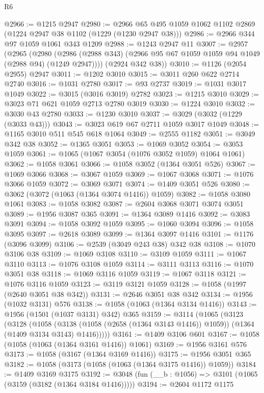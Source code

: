 \begin{lexlean}{R6}
\begin{coremodule}
@2966 := @1215 @2947
@2980 := @2966 @65 @495 @1059 @1062 @1102 @2869 (@1224 @2947 @38 @1102 (@1229 (@1230 @2947 @38)))
@2986 := @2966 @344 @97 @1059 @1061 @343 @1209
@2988 := @1243 @2947 @11
@3007 := @2957
    (@2965
      (@2980 (@2986 (@2988 @343) (@2966 @95 @67 @1059 @1059 @94 @1049 (@2988 @94) (@1249 @2947))))
      (@2924 @342 @38))
@3010 := @1126 (@2054 @2955) @2947
@3011 := @1202 @3010
@3015 := @3011 @260 @622 @2714 @2740
@3016 := @1031 @2780
@3017 := @93 @2737
@3019 := @1031 @3017 @1049
@3022 := @3015 (@3016 @3019) @2782
@3023 := @1215 @3010
@3029 := @3023 @71 @621 @1059 @2713 @2780 @3019
@3030 := @1224 @3010
@3032 := @3030 @43 @2780
@3033 := @1230 @3010
@3037 := @3029 (@3032 (@1229 (@3033 @43)))
@3043 := @3023 @619 @67 @2711 @1059 @3017 @1049
@3048 := @1165 @3010 @511 @545 @618 @1064
@3049 := @2555 @1182
@3051 := @3049 @342 @38
@3052 := @1365 @3051
@3053 := @1069 @3052
@3054 := @3053 @1059
@3061 := @1065 (@1067 @3054 (@1076 @3052 @1059) @1064 @1061)
@3062 := @1058 @3061
@3066 := @1058 @3052 (@1364 @3051 @526)
@3067 := @1069 @3066
@3068 := @3067 @1059
@3069 := @1067 @3068
@3071 := @1076 @3066 @1059
@3072 := @3069 @3071
@3074 := @1409 @3051 @526
@3080 := @3062 (@3072 (@1063 (@1364 @3074 @1416)) @1059)
@3082 := @1058 @3080 @1061
@3083 := @1058 @3082
@3087 := @2604 @3068 @3071 @3074 @3051
@3089 := @1956 @3087 @365
@3091 := @1364 @3089 @1416
@3092 := @3083 @3091
@3094 := @1058 @3092 @1059
@3095 := @1060 @3094
@3096 := @1058 @3095
@3097 := @2618 @3089
@3099 := @1364 @3097 @1416
@3101 := @1176 (@3096 @3099)
@3106 := @2539 (@3049 @243 @38) @342 @38
@3108 := @1070 @3106 @38
@3109 := @1069 @3108
@3110 := @3109 @1059
@3111 := @1067 @3110
@3113 := @1076 @3108 @1059
@3114 := @3111 @3113
@3116 := @1070 @3051 @38
@3118 := @1069 @3116 @1059
@3119 := @1067 @3118
@3121 := @1076 @3116 @1059
@3123 := @3119 @3121 @1059
@3128 := @1058 (@1997 (@2640 @3051 @38 @342))
@3131 := @2646 @3051 @38 @342
@3134 := @1956 (@1032 @3131) @576
@3138 := @1058 (@1063 (@1364 @3134 @1416))
@3143 := @1956 (@1501 (@1037 @3131) @342) @365
@3159 := @3114
    (@1065
      (@3123
        (@3128
          (@1058
            (@3138 (@1058 (@2658 (@1364 @3143 @1416)) @1059))
            (@1364 (@1409 @3134 @3143) @1416)))))
@3161 := @1409 @3106 @601
@3167 := @1058 (@1058 (@1063 (@1364 @3161 @1416)) @1061)
@3169 := @1956 @3161 @576
@3173 := @1058 (@3167 (@1364 @3169 @1416))
@3175 := @1956 @3051 @365
@3182 := @1058 (@3173 (@1058 (@1063 (@1364 @3175 @1416)) @1059))
@3184 := @1409 @3169 @3175
@3192 := @3048 (fun (__b : @1056) => @3101 (@1065 (@3159 (@3182 (@1364 @3184 @1416)))))
@3194 := @2604 @1172 @1175

\end{coremodule}
\end{lexlean}
